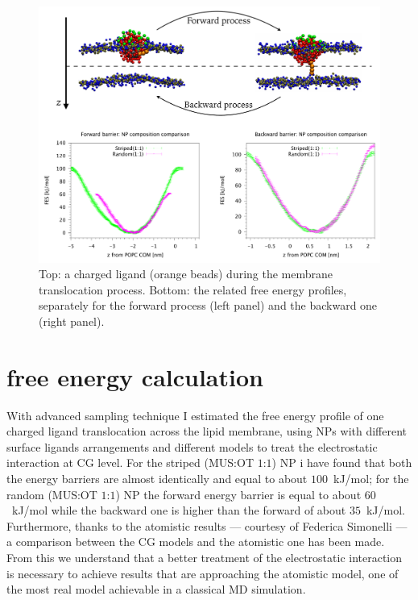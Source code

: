 
\begin{figure}[ht]
	\center
	\includegraphics[width=\textwidth]{./img/coglionazzo}
	\caption{Top: a charged ligand (orange beads) during the membrane translocation process. Bottom: the related free energy profiles, separately for the forward process (left panel) and the backward one (right panel).}
	\label{fig:coglionazzo}
\end{figure}

\section{free energy calculation}
With advanced sampling technique I estimated the free energy profile of one charged ligand translocation across the lipid membrane, using \acp{NP} with different surface ligands arrangements and different models to treat the electrostatic interaction at \ac{CG} level. For the striped (\acs{MUS}:\acs{OT} $1$:$1$) \ac{NP} i have found that both the energy barriers are almost identically and equal to about $100$~kJ/mol; for the random (\acs{MUS}:\acs{OT} $1$:$1$) \ac{NP} the forward energy barrier is equal to about $60$~kJ/mol while the backward one is higher than the forward of about $35$~kJ/mol. Furthermore, thanks to the atomistic results --- courtesy of Federica Simonelli --- a comparison between the \ac{CG} models and the atomistic one has been made. From this we understand that a better treatment of the electrostatic interaction is necessary to achieve results that are approaching the atomistic model, one of the most real model achievable in a classical \ac{MD} simulation.

